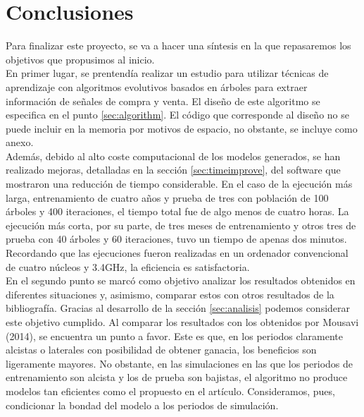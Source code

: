 \newpage
\section{Conclusiones}
Para finalizar este proyecto, se va a hacer una s\'intesis en la que repasaremos los objetivos que propusimos al inicio.\\

En primer lugar, se prentend\'ia realizar un estudio para utilizar t\'ecnicas de aprendizaje con algoritmos evolutivos basados en \'arboles para extraer informaci\'on de se\~nales de compra y venta. El dise\~no de este algoritmo se especifica en el punto \ref{sec:algorithm}. El c\'odigo que corresponde al dise\~no no se puede incluir en la memoria por motivos de espacio, no obstante, se incluye como anexo.\\

Adem\'as, debido al alto coste computacional de los modelos generados, se han realizado mejoras, detalladas en la secci\'on \ref{sec:timeimprove}, del software que mostraron una reducci\'on de tiempo considerable. En el caso de la ejecuci\'on m\'as larga, entrenamiento de cuatro a\~nos y prueba de tres con poblaci\'on de 100 \'arboles y 400 iteraciones, el tiempo total fue de algo menos de cuatro horas. La ejecuci\'on m\'as corta, por su parte, de tres meses de entrenamiento y otros tres de prueba con 40 \'arboles y 60 iteraciones, tuvo un tiempo de apenas dos minutos. Recordando que las ejecuciones fueron realizadas en un ordenador convencional de cuatro n\'ucleos y 3.4GHz, la eficiencia es satisfactoria.\\

En el segundo punto se marc\'o como objetivo analizar los resultados obtenidos en diferentes situaciones y, asimismo, comparar estos con otros resultados de la bibliograf\'ia. Gracias al desarrollo de la secci\'on \ref{sec:analisis} podemos considerar este objetivo cumplido. Al comparar los resultados con los obtenidos por Mousavi (2014), se encuentra un punto a favor. Este es que, en los periodos claramente alcistas o laterales con posibilidad de obtener ganacia, los beneficios son ligeramente mayores. No obstante, en las simulaciones en las que los periodos de entrenamiento son alcista y los de prueba son bajistas, el algoritmo no produce modelos tan eficientes como el propuesto en el art\'iculo. Consideramos, pues, condicionar la bondad del modelo a los periodos de simulaci\'on.\\



